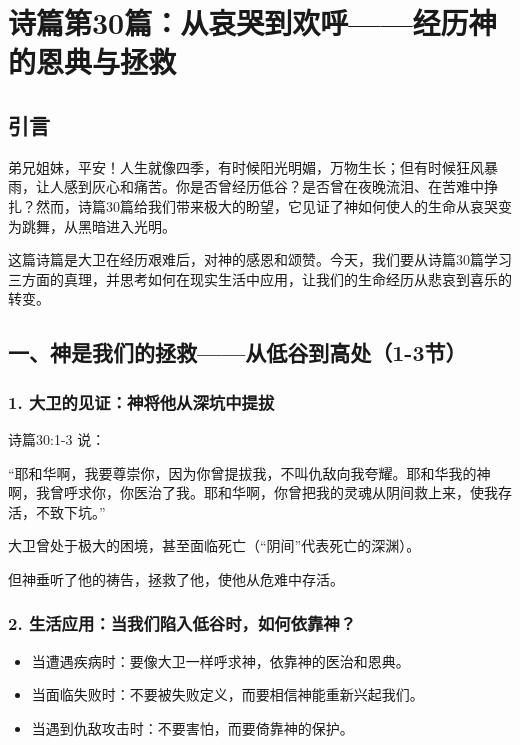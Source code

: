 \documentclass[a4paper, 12pt]{article}
\begin{document}
\section{诗篇第30篇：从哀哭到欢呼——经历神的恩典与拯救}
\subsection*{引言}

\hspace{0.6cm}弟兄姐妹，平安！人生就像四季，有时候阳光明媚，万物生长；但有时候狂风暴雨，让人感到灰心和痛苦。你是否曾经历低谷？是否曾在夜晚流泪、在苦难中挣扎？然而，诗篇30篇给我们带来极大的盼望，它见证了神如何使人的生命从哀哭变为跳舞，从黑暗进入光明。

这篇诗篇是大卫在经历艰难后，对神的感恩和颂赞。今天，我们要从诗篇30篇学习三方面的真理，并思考如何在现实生活中应用，让我们的生命经历从悲哀到喜乐的转变。

\subsection*{一、神是我们的拯救——从低谷到高处（1-3节）}
\subsubsection*{1. 大卫的见证：神将他从深坑中提拔}
\hspace{0.6cm}诗篇30:1-3 说：

“耶和华啊，我要尊崇你，因为你曾提拔我，不叫仇敌向我夸耀。耶和华我的神啊，我曾呼求你，你医治了我。耶和华啊，你曾把我的灵魂从阴间救上来，使我存活，不致下坑。”



大卫曾处于极大的困境，甚至面临死亡（“阴间”代表死亡的深渊）。

但神垂听了他的祷告，拯救了他，使他从危难中存活。

\subsubsection*{2. 生活应用：当我们陷入低谷时，如何依靠神？}
\begin{itemize}
    \item 当遭遇疾病时：要像大卫一样呼求神，依靠神的医治和恩典。

    \item 当面临失败时：不要被失败定义，而要相信神能重新兴起我们。

    \item 当遇到仇敌攻击时：不要害怕，而要倚靠神的保护。

\end{itemize}
\end{document}
